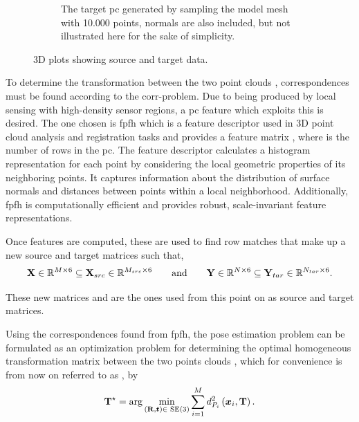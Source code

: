\begin{figure}[!h]
\begin{subfigure}[b]{0.48\textwidth}
		\caption{The target \gls{pc} generated by sampling the model mesh with \num{10,000} points, normals are also included, but not illustrated here for the sake of simplicity.}
		\label{fig:pe-pc-target}
	\end{subfigure}
	\caption{3D plots showing source and target data.}
	\label{fig:pe-contact-position-gazebo}
\end{figure}

To determine the transformation between the two point clouds , correspondences must be found according to the \gls{corr-problem}. Due to  being produced by local sensing with high-density sensor regions, a \gls{pc} feature which exploits this is desired. The one chosen is \gls{fpfh} which is a feature descriptor used in 3D point cloud analysis and registration tasks and provides a feature matrix , where  is the number of rows in the \gls{pc}. The feature descriptor calculates a histogram representation for each point by considering the local geometric properties of its neighboring points. It captures information about the distribution of surface normals and distances between points within a local neighborhood. Additionally, \gls{fpfh} is computationally efficient and provides robust, scale-invariant feature representations. \medskip

Once features are computed, these are used to find row matches that make up a new source and target matrices such that,
%
\begin{equation}
	\mat{X}\inR{M \times 6} \subseteq \mat{X}_{src}\inR{M_{src}\times 6} \qquad \text{and} \qquad \mat{Y}\inR{N \times 6} \subseteq \mat{Y}_{tar}\inR{N_{tar}\times 6}.
\end{equation}

These new matrices  and  are the ones used from this point on as source and target matrices. \medskip

Using the correspondences found from \gls{fpfh}, the pose estimation problem can be formulated as an optimization problem for determining the optimal homogeneous transformation matrix between the two points clouds , which for convenience is from now on referred to as \tf[T]{\star}{}, by
%
\begin{equation} \label{eq:point-cloud-registration-problem}
	\tf[T]{\star}{} = \arg \min_{(\mat{R},\vec{t})\in\SE (3)} \sum^M_{i=1} d_{P_i}^{2}\left( \vec{x}_i, \mat{T} \right).
\end{equation}


